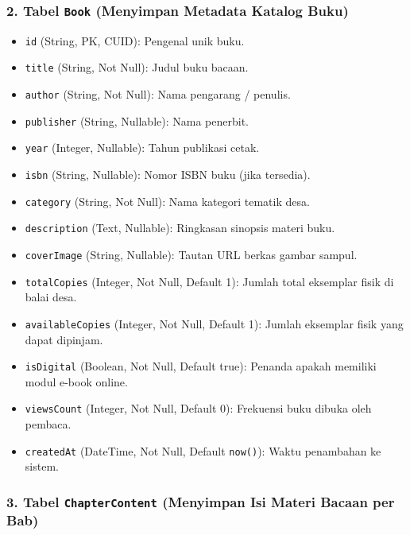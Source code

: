 \documentclass[
  indonesian,
  12pt,
]{report}
\providecommand{\tightlist}{%
  \setlength{\itemsep}{0pt}\setlength{\parskip}{0pt}}
\begin{document}
\subsubsection{\texorpdfstring{2. Tabel \texttt{Book} (Menyimpan
Metadata Katalog
Buku)}{2. Tabel Book (Menyimpan Metadata Katalog Buku)}}\label{tabel-book-menyimpan-metadata-katalog-buku}

\begin{itemize}
\tightlist
\item
  \texttt{id} (String, PK, CUID): Pengenal unik buku.
\item
  \texttt{title} (String, Not Null): Judul buku bacaan.
\item
  \texttt{author} (String, Not Null): Nama pengarang / penulis.
\item
  \texttt{publisher} (String, Nullable): Nama penerbit.
\item
  \texttt{year} (Integer, Nullable): Tahun publikasi cetak.
\item
  \texttt{isbn} (String, Nullable): Nomor ISBN buku (jika tersedia).
\item
  \texttt{category} (String, Not Null): Nama kategori tematik desa.
\item
  \texttt{description} (Text, Nullable): Ringkasan sinopsis materi buku.
\item
  \texttt{coverImage} (String, Nullable): Tautan URL berkas gambar
  sampul.
\item
  \texttt{totalCopies} (Integer, Not Null, Default 1): Jumlah total
  eksemplar fisik di balai desa.
\item
  \texttt{availableCopies} (Integer, Not Null, Default 1): Jumlah
  eksemplar fisik yang dapat dipinjam.
\item
  \texttt{isDigital} (Boolean, Not Null, Default true): Penanda apakah
  memiliki modul e-book online.
\item
  \texttt{viewsCount} (Integer, Not Null, Default 0): Frekuensi buku
  dibuka oleh pembaca.
\item
  \texttt{createdAt} (DateTime, Not Null, Default \texttt{now()}): Waktu
  penambahan ke sistem.
\end{itemize}

\subsubsection{\texorpdfstring{3. Tabel \texttt{ChapterContent}
(Menyimpan Isi Materi Bacaan per
Bab)}{3. Tabel ChapterContent (Menyimpan Isi Materi Bacaan per Bab)}}\label{tabel-chaptercontent-menyimpan-isi-materi-bacaan-per-bab}
\end{document}
